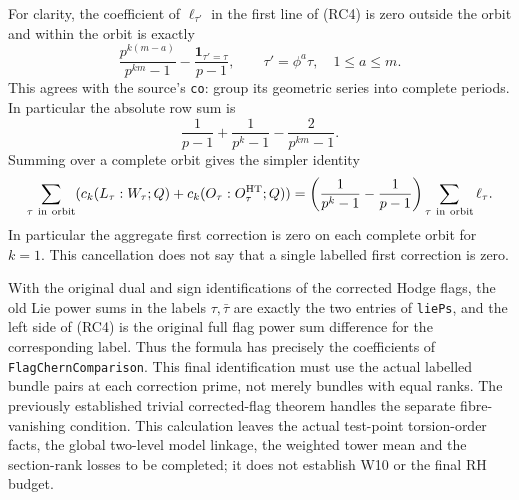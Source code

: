For clarity, the coefficient of \(\ell_{\tau'}\) in the
first line of (RC4) is zero outside the orbit and within
the orbit is exactly
\[
 \frac{p^{k(m-a)}}{p^{km}-1}
             -\frac{\mathbf1_{\tau'=\tau}}{p-1},
 \qquad \tau'=\phi^a\tau,\quad 1\le a\le m .
\]
This agrees with the source's \texttt{co}: group its geometric
series into complete periods. In particular the absolute row sum
is
\[
 \frac1{p-1}+\frac1{p^k-1}-\frac2{p^{km}-1}.
\]
Summing over a complete orbit gives the simpler identity
\[
 \sum_{\tau\ {\rm in\ orbit}}
  (c_k(L_\tau:W_\tau;Q)+c_k(O_\tau:O_\tau^{\rm HT};Q))
 =\left(\frac1{p^k-1}-\frac1{p-1}\right)
                      \sum_{\tau\ {\rm in\ orbit}}\ell_\tau .
\]
In particular the aggregate first correction is zero on
each complete orbit for \(k=1\). This cancellation does not
say that a single labelled first correction is zero.

With the original dual and sign identifications of the
corrected Hodge flags, the old Lie power sums in the labels
\(\tau,\bar\tau\) are exactly the two entries of \texttt{liePs},
and the left side of (RC4) is the original full flag power
sum difference for the corresponding label. Thus the formula
has precisely the coefficients of \texttt{FlagChernComparison}.
This final identification must use the actual labelled
bundle pairs at each correction prime, not merely bundles
with equal ranks. The previously established trivial
corrected-flag theorem handles the separate fibre-vanishing
condition. This calculation leaves the actual test-point
torsion-order facts, the global two-level model linkage,
the weighted tower mean and the section-rank losses to be
completed; it does not establish W10 or the final RH budget.
